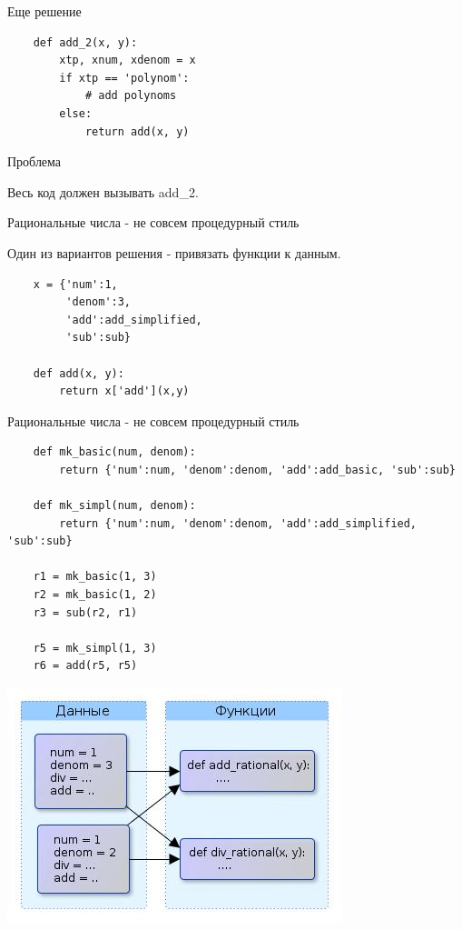 \documentclass{article}
\begin{document}
\begin{center} Еще решение \end{center} 
\begin{lstlisting}
    def add_2(x, y):
        xtp, xnum, xdenom = x
        if xtp == 'polynom':
            # add polynoms
        else:
            return add(x, y)
\end{lstlisting}
\newpage

\begin{center} Проблема \end{center} 
Весь код должен вызывать add\_2.
\newpage

\begin{center} Рациональные числа - не совсем процедурный стиль \end{center}
Один из вариантов решения - привязать функции к данным. \\
\begin{lstlisting}
    x = {'num':1, 
         'denom':3, 
         'add':add_simplified, 
         'sub':sub}

    def add(x, y): 
        return x['add'](x,y)
\end{lstlisting}
\newpage

\begin{center} Рациональные числа - не совсем процедурный стиль \end{center}
\begin{lstlisting}
    def mk_basic(num, denom):
        return {'num':num, 'denom':denom, 'add':add_basic, 'sub':sub}

    def mk_simpl(num, denom):
        return {'num':num, 'denom':denom, 'add':add_simplified, 'sub':sub}

    r1 = mk_basic(1, 3)
    r2 = mk_basic(1, 2)
    r3 = sub(r2, r1)

    r5 = mk_simpl(1, 3)
    r6 = add(r5, r5)
\end{lstlisting}
\newpage

\begin{center} \includegraphics{images/semi_OOP_style.jpg} \end{center} 
\newpage
\end{document}
